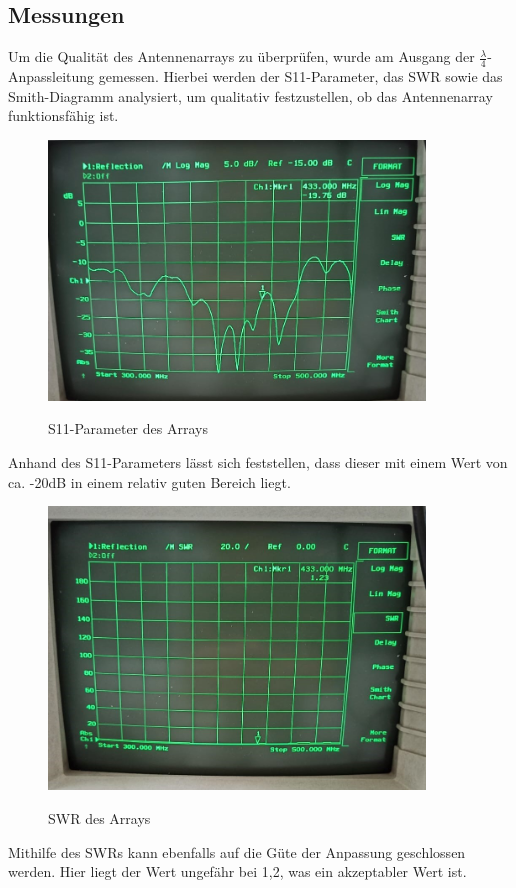 \subsection{Messungen}
Um die Qualität des Antennenarrays zu überprüfen, wurde am Ausgang der $\frac{\lambda}{4}$-Anpassleitung gemessen. Hierbei werden der S11-Parameter, das SWR sowie das Smith-Diagramm analysiert, um qualitativ festzustellen, ob das Antennenarray funktionsfähig ist.

\begin{figure}[H]
	\centering
	\includegraphics[width=10cm]{../ref/Array-S11.jpg}
	\label{fig:array-S11}
	\caption{S11-Parameter des Arrays}
\end{figure}

Anhand des S11-Parameters lässt sich feststellen, dass dieser mit einem Wert von ca. -20dB in einem relativ guten Bereich liegt.

\begin{figure}[H]
	\centering
	\includegraphics[width=10cm]{../ref/Array-SWR.jpg}
	\label{fig:array-SWR}
	\caption{SWR des Arrays}
\end{figure}

Mithilfe des SWRs kann ebenfalls auf die Güte der Anpassung geschlossen werden. Hier liegt der Wert ungefähr bei 1,2, was ein akzeptabler Wert ist.

